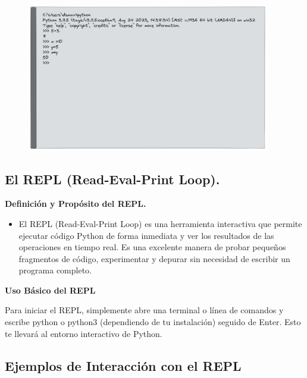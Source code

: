 \documentclass[
  a4paper,
  DIV=11,
  numbers=noendperiod,
  onepage,
  openany]{scrreprt}
\providecommand{\tightlist}{%
  \setlength{\itemsep}{0pt}\setlength{\parskip}{0pt}}\usepackage{longtable,booktabs,array}
\begin{document}
\begin{figure}

{\centering \includegraphics[width=4.16667in,height=\textheight]{unidades/unidad1/images/repl.png}

}

\end{figure}

\subsection{El REPL (Read-Eval-Print
Loop).}\label{el-repl-read-eval-print-loop.}

\textbf{Definición y Propósito del REPL.}

\begin{itemize}
\tightlist
\item
  El REPL (Read-Eval-Print Loop) es una herramienta interactiva que
  permite ejecutar código Python de forma inmediata y ver los resultados
  de las operaciones en tiempo real. Es una excelente manera de probar
  pequeños fragmentos de código, experimentar y depurar sin necesidad de
  escribir un programa completo.
\end{itemize}

\textbf{Uso Básico del REPL}

Para iniciar el REPL, simplemente abre una terminal o línea de comandos
y escribe python o python3 (dependiendo de tu instalación) seguido de
Enter. Esto te llevará al entorno interactivo de Python.

\subsection{Ejemplos de Interacción con el
REPL}\label{ejemplos-de-interacciuxf3n-con-el-repl}
\end{document}
